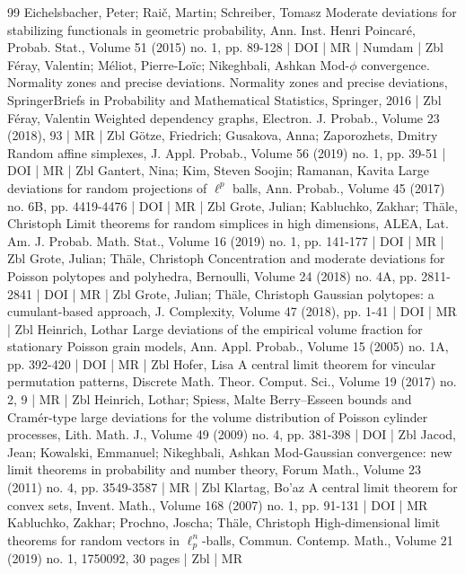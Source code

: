 \documentclass[10pt]{amsart}
\theoremstyle{definition}\newtheorem{defi}[theo]{Definition}\newtheorem{rema}[theo]{Remark}\newtheorem{exam}[theo]{Example}\newtheorem{exem}[theo]{Example}\newtheorem{nota}[theo]{Notation}
\begin{document}
\begin{thebibliography}{99}
Eichelsbacher, Peter; Raič, Martin; Schreiber, Tomasz Moderate deviations for stabilizing functionals in geometric probability, Ann. Inst. Henri Poincaré, Probab. Stat., Volume 51 (2015) no. 1, pp. 89-128 | DOI | MR | Numdam | Zbl
Féray, Valentin; Méliot, Pierre-Loïc; Nikeghbali, Ashkan Mod-$\phi $ convergence. Normality zones and precise deviations. Normality zones and precise deviations, SpringerBriefs in Probability and Mathematical Statistics, Springer, 2016 | Zbl
Féray, Valentin Weighted dependency graphs, Electron. J. Probab., Volume 23 (2018), 93 | MR | Zbl
Götze, Friedrich; Gusakova, Anna; Zaporozhets, Dmitry Random affine simplexes, J. Appl. Probab., Volume 56 (2019) no. 1, pp. 39-51 | DOI | MR | Zbl
Gantert, Nina; Kim, Steven Soojin; Ramanan, Kavita Large deviations for random projections of $\ell ^p$ balls, Ann. Probab., Volume 45 (2017) no. 6B, pp. 4419-4476 | DOI | MR | Zbl
Grote, Julian; Kabluchko, Zakhar; Thäle, Christoph Limit theorems for random simplices in high dimensions, ALEA, Lat. Am. J. Probab. Math. Stat., Volume 16 (2019) no. 1, pp. 141-177 | DOI | MR | Zbl
Grote, Julian; Thäle, Christoph Concentration and moderate deviations for Poisson polytopes and polyhedra, Bernoulli, Volume 24 (2018) no. 4A, pp. 2811-2841 | DOI | MR | Zbl
Grote, Julian; Thäle, Christoph Gaussian polytopes: a cumulant-based approach, J. Complexity, Volume 47 (2018), pp. 1-41 | DOI | MR | Zbl
Heinrich, Lothar Large deviations of the empirical volume fraction for stationary Poisson grain models, Ann. Appl. Probab., Volume 15 (2005) no. 1A, pp. 392-420 | DOI | MR | Zbl
Hofer, Lisa A central limit theorem for vincular permutation patterns, Discrete Math. Theor. Comput. Sci., Volume 19 (2017) no. 2, 9 | MR | Zbl
Heinrich, Lothar; Spiess, Malte Berry–Esseen bounds and Cramér-type large deviations for the volume distribution of Poisson cylinder processes, Lith. Math. J., Volume 49 (2009) no. 4, pp. 381-398 | DOI | Zbl
Jacod, Jean; Kowalski, Emmanuel; Nikeghbali, Ashkan Mod-Gaussian convergence: new limit theorems in probability and number theory, Forum Math., Volume 23 (2011) no. 4, pp. 3549-3587 | MR | Zbl
Klartag, Bo’az A central limit theorem for convex sets, Invent. Math., Volume 168 (2007) no. 1, pp. 91-131 | DOI | MR
Kabluchko, Zakhar; Prochno, Joscha; Thäle, Christoph High-dimensional limit theorems for random vectors in $\ell _p^n$-balls, Commun. Contemp. Math., Volume 21 (2019) no. 1, 1750092, 30 pages | Zbl | MR

\end{thebibliography}
\end{document}
